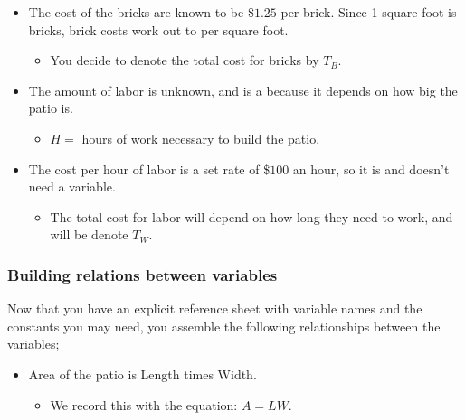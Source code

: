 \documentclass{ximeraXloud}
\begin{document}
\begin{example}
\begin{itemize}
            \item The cost of the bricks are known to be \$$1.25$ per brick. Since 1 square foot is  bricks, brick costs work out to  per square foot.
            
            \begin{itemize}
                \item You decide to denote the total cost for bricks by $T_B$.
            \end{itemize}
            
            \item The amount of labor is unknown, and is a  because it depends on how big the patio is.
            
            \begin{itemize}
            \item $H =$ hours of work necessary to build the patio.
            \end{itemize}
            
            \item The cost per hour of labor is a set rate of \$$100$ an hour, so it is  and doesn't need a variable.
            
            \begin{itemize}
                \item The total cost for labor will depend on how long they need to work, and will be denote $T_W$.
            \end{itemize}
        \end{itemize}
    
    \subsubsection*{Building relations between variables}
        Now that you have an explicit reference sheet with variable names and the constants you may need, you assemble the following relationships between the variables;
        
        \begin{itemize}
            \item Area of the patio is Length times Width.
            
            \begin{itemize}
                \item We record this with the equation: $A = LW$.
            \end{itemize}
            

\end{itemize}
\end{example}
\end{document}

